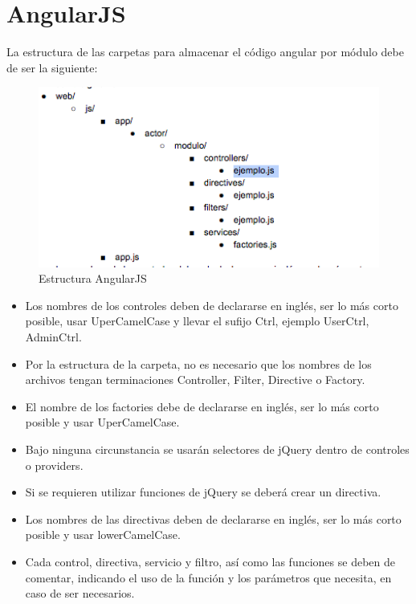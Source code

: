 \section{AngularJS}
La estructura de las carpetas para almacenar el código angular por módulo debe de ser la siguiente:
				\begin{figure}[htbp!]
		\centering
			\includegraphics[width=1\textwidth]{images/estructura}
		\caption{Estructura AngularJS}
	\end{figure}

\begin{itemize}
	\item Los nombres de los controles deben de declararse en inglés, ser lo más corto posible, usar UperCamelCase y llevar el sufijo Ctrl, ejemplo UserCtrl, AdminCtrl.

	\item Por la estructura de la carpeta, no es necesario que los nombres de los archivos tengan terminaciones Controller, Filter, Directive o Factory.

	\item El nombre de los factories debe de declararse en inglés, ser lo más corto posible y usar UperCamelCase.

	\item Bajo ninguna circunstancia se usarán selectores de jQuery dentro de controles o providers.

	\item Si se requieren utilizar funciones de jQuery se deberá crear un directiva.

	\item Los nombres de las directivas deben de declararse en inglés, ser lo más corto posible y usar lowerCamelCase.

	\item Cada control, directiva, servicio y filtro, así como las funciones se deben de comentar, indicando el uso de la función y los parámetros que necesita, en caso de ser necesarios.

\end{itemize}

